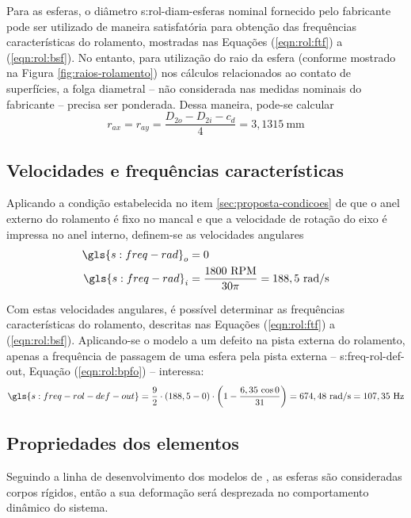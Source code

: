 \documentclass[12pt,oneside,english,brazil,lmodern,siglas,simbolos,cite=num]{ucsmonograph}
\begin{document}
	Para as esferas, o diâmetro \gls{s:rol-diam-esferas} nominal fornecido pelo fabricante pode ser utilizado de maneira satisfatória para obtenção das frequências características do rolamento, mostradas nas Equações (\ref{eqn:rol:ftf}) a (\ref{eqn:rol:bsf}).
	No entanto, para utilização do raio da esfera (conforme mostrado na Figura \ref{fig:raios-rolamento}) nos cálculos relacionados ao contato de superfícies, a folga diametral -- não considerada nas medidas nominais do fabricante -- precisa ser ponderada.
	Dessa maneira, pode-se calcular
	\begin{equation}
		r_{ax} = r_{ay} = \frac{D_{2o} - D_{2i} - c_d}{4} = 3,1315\ \text{mm}
	\end{equation}
	
	\subsection{Velocidades e frequências características}
	Aplicando a condição estabelecida no item \ref{sec:proposta-condicoes} de que o anel externo do rolamento é fixo no mancal e que a velocidade de rotação do eixo é impressa no anel interno, definem-se as velocidades angulares
	\begin{align}
		\gls{s:freq-rad}_o &= 0 \\
		\gls{s:freq-rad}_i &= \frac{1800\ \text{RPM}}{30\pi} = 188,5\ \text{rad/s}
	\end{align}
	
	Com estas velocidades angulares, é possível determinar as frequências características do rolamento, descritas nas Equações (\ref{eqn:rol:ftf}) a (\ref{eqn:rol:bsf}).
	Aplicando-se o modelo a um defeito na pista externa do rolamento, apenas a frequência de passagem de uma esfera pela pista externa -- \gls{s:freq-rol-def-out}, Equação (\ref{eqn:rol:bpfo}) -- interessa:
	\begin{equation*}
		\gls{s:freq-rol-def-out} = \frac{9}{2}\cdot(188,5 - 0)\cdot
		\left( 1 - \frac{6,35\,\cos 0}{31} \right) =
		674,48\ \text{rad/s} =	107,35\ \text{Hz}
	\end{equation*}
	
	\subsection{Propriedades dos elementos}
	Seguindo a linha de desenvolvimento dos modelos de \cite{mcfadden:1984,tandon:1997,sassi:2007,cong:2013}, as esferas são consideradas corpos rígidos, então a sua deformação será desprezada no comportamento dinâmico do sistema.
	
\end{document}
